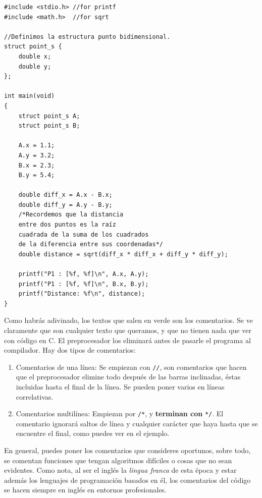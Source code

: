 \documentclass[a4paper]{article}
\begin{document}
\noindent
\begin{minipage}[H]{\linewidth}
\mbox{}
\begin{lstlisting}[style=C,
caption={Example of program with comments},
label={lst:comments1}]
#include <stdio.h> //for printf
#include <math.h>  //for sqrt

//Definimos la estructura punto bidimensional.
struct point_s {
    double x;
    double y;
};

int main(void)
{
    struct point_s A;
    struct point_s B;

    A.x = 1.1;
    A.y = 3.2;
    B.x = 2.3;
    B.y = 5.4;

    double diff_x = A.x - B.x;
    double diff_y = A.y - B.y;
    /*Recordemos que la distancia
    entre dos puntos es la raíz
    cuadrada de la suma de los cuadrados
    de la diferencia entre sus coordenadas*/
    double distance = sqrt(diff_x * diff_x + diff_y * diff_y);

    printf("P1 : [%f, %f]\n", A.x, A.y);
    printf("P1 : [%f, %f]\n", B.x, B.y);
    printf("Distance: %f\n", distance);
}
\end{lstlisting}
\end{minipage}

Como habrás adivinado, los textos que salen en verde son los comentarios. Se ve
claramente que son cualquier texto que queramos, y que no tienen nada que ver
con código en C. El preprocesador los eliminará antes de pasarle el programa al
compilador. Hay dos tipos de comentarios:
\begin{enumerate}
\item Comentarios de una línea: Se empiezan con \verb!//!, son comentarios que
hacen que el preprocesador elimine todo después de las barras inclinadas, éstas
incluidas hasta el final de la línea.
Se pueden poner varios en líneas correlativas.
\item Comentarios multilínea: Empiezan por \verb!/*!, y \textbf{terminan con}
\verb!*/!. El comentario ignorará saltos de línea y cualquier carácter que
haya hasta que se encuentre el final, como puedes ver en el ejemplo.
\end{enumerate}

En general, puedes poner los comentarios que consideres oportunos, sobre todo,
se comentan funciones que tengan algoritmos difíciles o cosas que no sean
evidentes. Como nota, al ser el inglés la \emph{lingua franca} de esta época y
estar además los lenguajes de programación basados en él, los comentarios del
código se hacen siempre en inglés en entornos profesionales.
\end{document}
